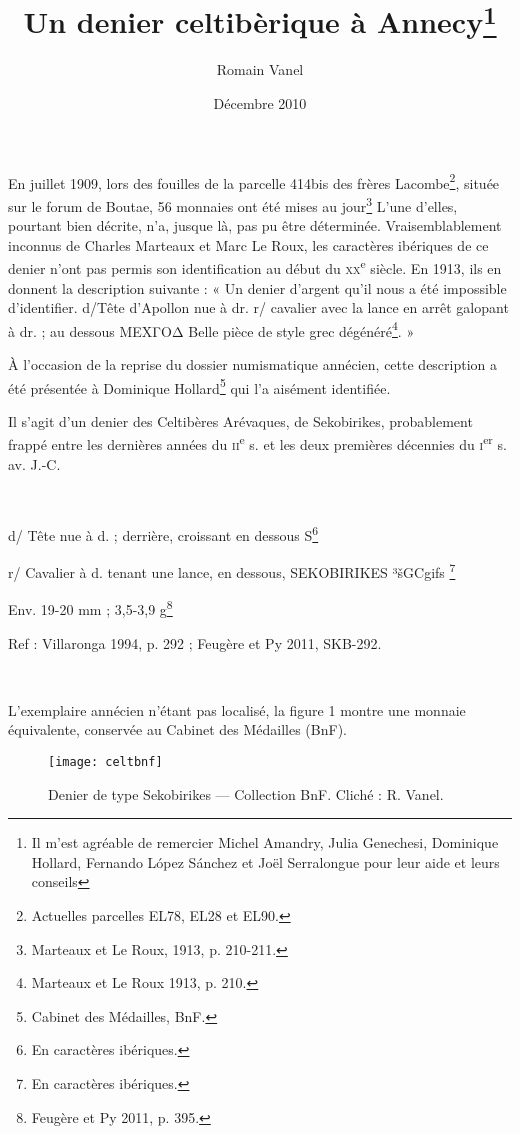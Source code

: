 \documentclass[a4paper,12pt]{article}
\title{Un denier celtibèrique à Annecy\footnote{Il m’est agréable de remercier Michel Amandry, Julia Genechesi, Dominique Hollard, Fernando López Sánchez et Joël Serralongue pour leur aide et leurs conseils}}
\date{Décembre 2010}
\author{Romain Vanel}
\begin{document}
\maketitle
\thispagestyle{fancy}




En juillet 1909, lors des fouilles de la parcelle 414bis des frères 
Lacombe\footnote{Actuelles parcelles EL78, EL28 et EL90.}, située sur le forum de
 Boutae, 56 monnaies ont été mises au jour\footnote{Marteaux et Le Roux, 1913, p. 210-211.}
L’une d’elles, pourtant bien décrite, n’a, jusque là, pas pu être déterminée. 
Vraisemblablement inconnus de Charles Marteaux et Marc Le Roux, les caractères ibériques
 de ce denier n’ont pas permis son identification au début du \textsc{xx}\textsuperscript{e} siècle.
 En 1913, ils en donnent la description suivante : « Un denier
 d’argent qu’il nous a été impossible d’identifier. d/Tête d’Apollon nue à dr.
 r/ cavalier avec la lance en arrêt galopant à dr. ; au dessous ΜΕΧΓΟΔ Belle
 pièce de style grec dégénéré\footnote{Marteaux et Le Roux 1913, p. 210.}. »

À l’occasion de la reprise du dossier numismatique annécien, cette description
 a été présentée à Dominique Hollard\footnote{Cabinet des Médailles, BnF.} qui l’a aisément identifiée.

Il s’agit d’un denier des Celtibères Arévaques, de Sekobirikes, probablement frappé entre les dernières années du
\textsc{ii}\textsuperscript{e} s. et les deux premières décennies du \textsc{i}\textsuperscript{er} s. av. J.-C.

~

d/ Tête nue à d. ; derrière, croissant en dessous S\footnote{En caractères ibériques.}

r/ Cavalier à d. tenant une lance, en dessous, SEKOBIRIKES {\celtib ³šGCgiƒs} \footnote{En caractères ibériques.}

Env. 19-20 mm ; 3,5-3,9 g\footnote{Feugère et Py 2011, p. 395.}

Ref : Villaronga 1994, p. 292 ; Feugère et Py 2011, SKB-292.

~

L’exemplaire annécien n’étant pas localisé, la figure 1 montre une monnaie
équivalente, conservée au Cabinet des Médailles (BnF).


\begin{figure}[!h]
\texttt{[image: celtbnf]}
\centering
\caption{Denier de type Sekobirikes --- Collection BnF. Cliché : R. Vanel.}
\end{figure}
\end{document}
